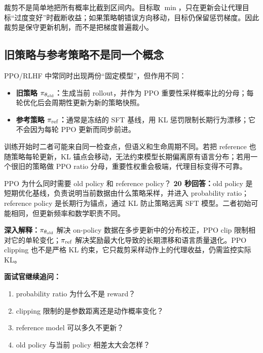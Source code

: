 裁剪不是简单地把所有概率比截到区间内。目标取 $\min$，只在更新会让代理目标“过度变好”时截断收益；如果策略朝错误方向移动，目标仍保留惩罚梯度。因此裁剪是保守更新机制，而不是把梯度普遍裁小。

\subsection{旧策略与参考策略不是同一个概念}

PPO/RLHF 中常同时出现两份“固定模型”，但作用不同：

\begin{itemize}
  \item \textbf{旧策略 $\pi_{\theta_{\rm old}}$：}生成当前 rollout，并作为 PPO 重要性采样概率比的分母；每轮优化后会周期性更新为新的策略快照。
  \item \textbf{参考策略 $\pi_{\rm ref}$：}通常是冻结的 SFT 基线，用 KL 惩罚限制长期行为漂移；它不会因为每轮 PPO 更新而同步前进。
\end{itemize}

训练开始时二者可能来自同一检查点，但语义和生命周期不同。若把 reference 也随策略每轮更新，KL 锚点会移动，无法约束模型长期偏离原有语言分布；若用一个很旧的策略做 PPO ratio 分母，重要性权重会极端，代理目标变得不可靠。

\begin{interviewbox}{PPO 为什么同时需要 old policy 和 reference policy？}
\textbf{20 秒回答：}old policy 是短期优化基线，负责说明当前数据由什么策略采样，并进入 probability ratio；reference policy 是长期行为锚点，通过 KL 防止策略远离 SFT 模型。二者初始可能相同，但更新频率和数学职责不同。

\textbf{深入解释：}$\pi_{\theta_{\rm old}}$ 解决 on-policy 数据在多步更新中的分布校正，PPO clip 限制相对它的单轮变化；$\pi_{\rm ref}$ 解决奖励最大化导致的长期漂移和语言质量退化。PPO clipping 也不是严格 KL 约束，它只裁剪采样动作上的代理收益，仍需监控实际 KL。

\textbf{面试官继续追问：}
\begin{enumerate}
  \item probability ratio 为什么不是 reward？
  \item clipping 限制的是参数距离还是动作概率变化？
  \item reference model 可以多久不更新？
  \item old policy 与当前 policy 相差太大会怎样？
\end{enumerate}
\end{interviewbox}


